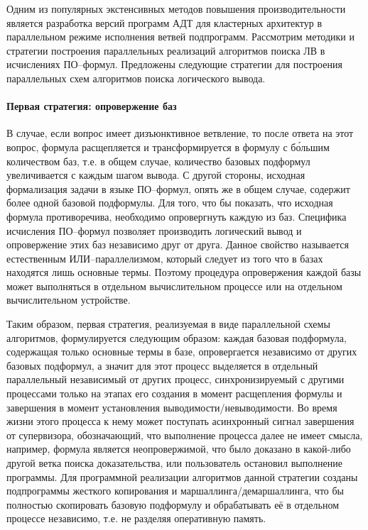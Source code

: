 Одним из популярных экстенсивных методов повышения производительности является разработка версий программ АДТ для кластерных архитектур в параллельном режиме исполнения ветвей подпрограмм. Рассмотрим методики и стратегии построения параллельных реализаций алгоритмов поиска ЛВ в исчислениях ПО--формул. Предложены следующие стратегии для построения параллельных схем алгоритмов поиска логического вывода.

\paragraph{Первая стратегия: опровержение баз}

В случае, если вопрос имеет дизъюнктивное ветвление, то после ответа на этот вопрос, формула расщепляется и трансформируется в формулу с б\'{о}льшим количеством баз, т.е. в общем случае, количество базовых подформул увеличивается с каждым шагом вывода. С другой стороны, исходная формализация задачи в языке ПО--формул, опять же в общем случае, содержит более одной базовой подформулы. Для того, что бы показать, что исходная формула противоречива, необходимо опровергнуть каждую из баз. Специфика исчисления ПО--формул позволяет производить логический вывод и опровержение этих баз независимо друг от друга. Данное свойство называется естественным ИЛИ--параллелизмом, который следует из того что в базах находятся лишь основные термы. Поэтому процедура опровержения каждой базы может выполняться в отдельном вычислительном процессе или на отдельном вычислительном устройстве.

Таким образом, первая стратегия, реализуемая в виде параллельной схемы алгоритмов, формулируется следующим образом: каждая базовая подформула, содержащая только основные термы в базе, опровергается независимо от других базовых подформул, а значит для этот процесс выделяется в отдельный параллельный независимый от других процесс, синхронизируемый с другими процессами только  на этапах его создания в момент расщепления формулы и завершения в момент установления выводимости/невыводимости. Во время жизни этого процесса к нему может поступать асинхронный сигнал завершения от супервизора, обозначающий, что выполнение процесса далее не имеет смысла, например, формула является неопровержимой, что было доказано в какой-либо другой ветка поиска доказательства, или пользователь остановил выполнение программы. Для программной реализации алгоритмов данной стратегии созданы подпрограммы жесткого копирования и маршаллинга/демаршаллинга, что бы полностью скопировать базовую подформулу и обрабатывать её в отдельном процессе независимо, т.е. не разделяя оперативную память.

